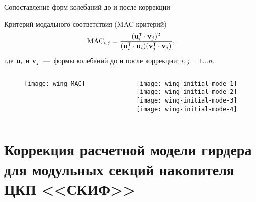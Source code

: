 \begin{frame}{Сопоставление форм колебаний до и после коррекции}
	\begin{block}{Критерий модального соответствия (MAC-критерий)}
		\begin{equation}
			\mathrm{MAC}_{i, j} = \frac{(\mathbf{u}_i ^ \intercal \cdot \mathbf{v}_j) ^ 2}{(\mathbf{u}_i ^ \intercal \cdot \mathbf{u}_i) (\mathbf{v}_j ^ \intercal \cdot \mathbf{v}_j)}, 
		\end{equation}
		где $ \mathbf{u}_i $ и $ \mathbf{v}_j $~---~формы колебаний до и после коррекции; $ i, j = 1 \hdots n $.
	\end{block}
	\vspace{-0.5em}
	\begin{columns}
		\begin{column}{0.49\textwidth}
			\centering
			\begin{figure}
				\texttt{[image: wing-MAC]}
			\end{figure}
		\end{column}
		\begin{column}{0.4\textwidth}
			\centering
			\begin{figure}
				\texttt{[image: wing-initial-mode-1]} \\ \vspace{0.2em}
				\texttt{[image: wing-initial-mode-2]} \\ \vspace{0.2em}
				\texttt{[image: wing-initial-mode-3]} \\ \vspace{0.2em}
				\texttt{[image: wing-initial-mode-4]}
			\end{figure}
		\end{column}
	\end{columns}
\end{frame}

\section{Коррекция расчетной модели гирдера для модульных секций накопителя ЦКП <<СКИФ>>}

